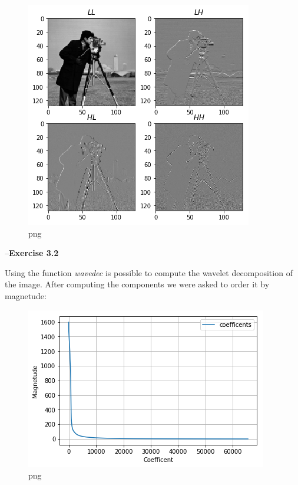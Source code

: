 \documentclass{letter}
\newcommand{\paragraph}[1]{\smallskip--\noindent\textbf{#1}}
\newcommand{\tmem}[1]{{\em #1\/}}
\begin{document}
\begin{figure}[h]
  \begin{center}
    \includegraphics{output_11_1.png} 
  \end{center}
  \caption{png}
\end{figure}

\paragraph{Exercise 3.2}\label{exercise-3.2}

Using the function {\tmem{wavedec}} is possible to compute the wavelet
decomposition of the image. After computing the components we were asked to
order it by magnetude:

\begin{figure}[h]
  \begin{center}
    \includegraphics{output_13_0.png} 
  \end{center}
  \caption{png}
\end{figure}
\end{document}
